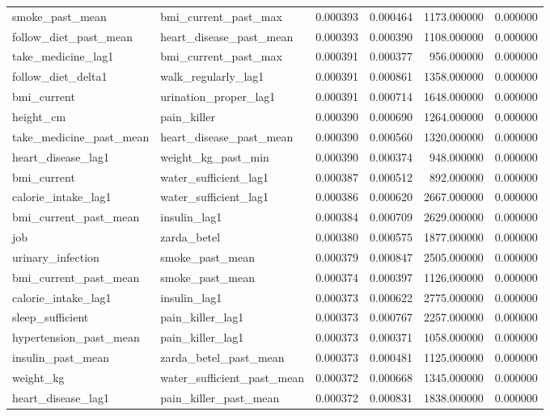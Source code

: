 \begin{longtable}{llrrrr}
smoke\_past\_mean & bmi\_current\_past\_max & 0.000393 & 0.000464 & 1173.000000 & 0.000000 \\
follow\_diet\_past\_mean & heart\_disease\_past\_mean & 0.000393 & 0.000390 & 1108.000000 & 0.000000 \\
take\_medicine\_lag1 & bmi\_current\_past\_max & 0.000391 & 0.000377 & 956.000000 & 0.000000 \\
follow\_diet\_delta1 & walk\_regularly\_lag1 & 0.000391 & 0.000861 & 1358.000000 & 0.000000 \\
bmi\_current & urination\_proper\_lag1 & 0.000391 & 0.000714 & 1648.000000 & 0.000000 \\
height\_cm & pain\_killer & 0.000390 & 0.000690 & 1264.000000 & 0.000000 \\
take\_medicine\_past\_mean & heart\_disease\_past\_mean & 0.000390 & 0.000560 & 1320.000000 & 0.000000 \\
heart\_disease\_lag1 & weight\_kg\_past\_min & 0.000390 & 0.000374 & 948.000000 & 0.000000 \\
bmi\_current & water\_sufficient\_lag1 & 0.000387 & 0.000512 & 892.000000 & 0.000000 \\
calorie\_intake\_lag1 & water\_sufficient\_lag1 & 0.000386 & 0.000620 & 2667.000000 & 0.000000 \\
bmi\_current\_past\_mean & insulin\_lag1 & 0.000384 & 0.000709 & 2629.000000 & 0.000000 \\
job & zarda\_betel & 0.000380 & 0.000575 & 1877.000000 & 0.000000 \\
urinary\_infection & smoke\_past\_mean & 0.000379 & 0.000847 & 2505.000000 & 0.000000 \\
bmi\_current\_past\_mean & smoke\_past\_mean & 0.000374 & 0.000397 & 1126.000000 & 0.000000 \\
calorie\_intake\_lag1 & insulin\_lag1 & 0.000373 & 0.000622 & 2775.000000 & 0.000000 \\
sleep\_sufficient & pain\_killer\_lag1 & 0.000373 & 0.000767 & 2257.000000 & 0.000000 \\
hypertension\_past\_mean & pain\_killer\_lag1 & 0.000373 & 0.000371 & 1058.000000 & 0.000000 \\
insulin\_past\_mean & zarda\_betel\_past\_mean & 0.000373 & 0.000481 & 1125.000000 & 0.000000 \\
weight\_kg & water\_sufficient\_past\_mean & 0.000372 & 0.000668 & 1345.000000 & 0.000000 \\
heart\_disease\_lag1 & pain\_killer\_past\_mean & 0.000372 & 0.000831 & 1838.000000 & 0.000000 \\

\end{longtable}
